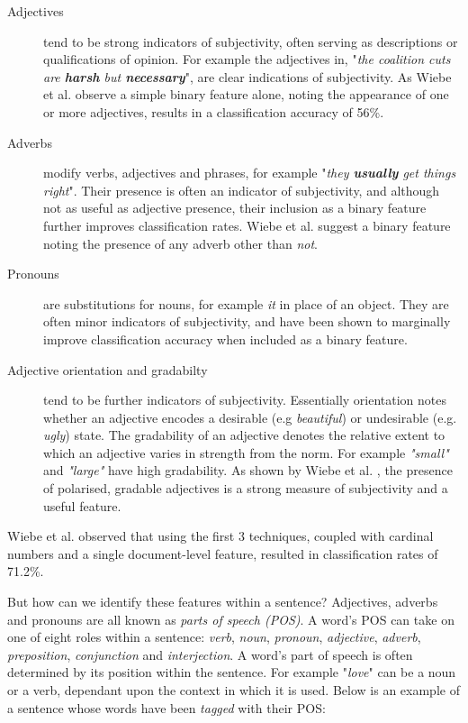 \begin{description}
	
	\item [Adjectives] tend to be strong indicators of subjectivity, often serving as descriptions or qualifications of opinion. For example the adjectives in, "\emph{the coalition cuts are \textbf{harsh} but \textbf{necessary}}", are clear indications of subjectivity. As Wiebe et al. \cite{Wiebe:1999cj} observe a simple binary feature alone, noting the appearance of one or more adjectives, results in a classification accuracy of 56\%. 
	
	\item [Adverbs] modify verbs, adjectives and phrases, for example "\emph{they \textbf{usually} get things right}". Their presence is often an indicator of subjectivity, and although not as useful as adjective presence, their inclusion as a binary feature further improves classification rates. Wiebe et al. \cite{Wiebe:1999cj} suggest a binary feature noting the presence of any adverb other than \emph{not}.
	
	\item [Pronouns] are substitutions for nouns, for example \emph{it} in place of an object. They are often minor indicators of subjectivity, and have been shown to marginally improve classification accuracy when included as a binary feature.
		
	\item [Adjective orientation and gradabilty] tend to be further indicators of subjectivity. Essentially orientation notes whether an adjective encodes a desirable (e.g \emph{beautiful}) or undesirable (e.g. \emph{ugly}) state. The gradability of an adjective denotes the relative extent to which an adjective varies in strength from the norm. For example \emph{"small"} and \emph{"large"} have high gradability. As shown by Wiebe et al. \cite{Wiebe:2000tk}, the presence of polarised, gradable adjectives is a strong measure of subjectivity and a useful feature.
	
\end{description}

Wiebe et al. \cite{Wiebe:1999cj} observed that using the first 3 techniques, coupled with cardinal numbers and a single document-level feature, resulted in classification rates of 71.2\%. 

But how can we identify these features within a sentence? Adjectives, adverbs and pronouns are all known as \emph{parts of speech (POS)}. A word's POS can take on one of eight roles within a sentence: \emph{verb}, \emph{noun}, \emph{pronoun}, \emph{adjective}, \emph{adverb}, \emph{preposition}, \emph{conjunction} and \emph{interjection}. A word's part of speech is often determined by its position within the sentence. For example "\emph{love}" can be a noun or a verb, dependant upon the context in which it is used. Below is an example of a sentence whose words have been \emph{tagged} with their POS:

